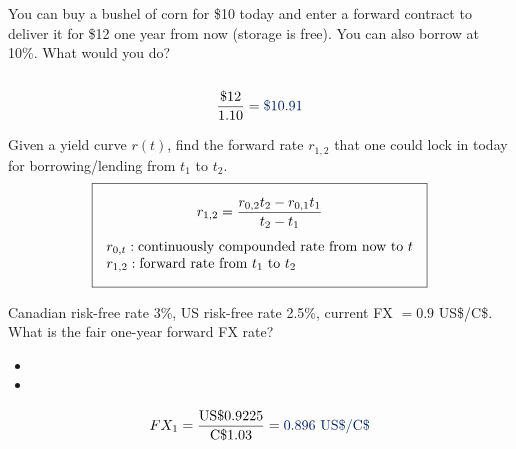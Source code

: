 \begin{example}
    You can buy a bushel of corn for \$10 today and enter a forward contract
    to deliver it for \$12 one year from now (storage is free). You can also
    borrow at 10\%. What would you do?
    \\
    \\
    \[\frac{\$12}{1.10} = \db{\$10.91}\]
\end{example}

\begin{example}
    Given a yield curve $r(t)$, find the forward rate $r_{1,2}$ that one
    could lock in today for borrowing/lending from $t_1$ to $t_2$.
    \\
    \[\boxed{\begin{gathered}
        r_{1,2} = \frac{r_{0,2}t_2 - r_{0,1}t_1}{t_2 - t_1}\\[4pt]
        \begin{array}{@{}l@{}}
            r_{0,t}: \text{continuously compounded rate from now to } t\\
            r_{1,2}: \text{forward rate from } t_1 \text{ to } t_2
        \end{array}
    \end{gathered}}\]
\end{example}

\begin{example}
    Canadian risk-free rate 3\%, US risk-free rate 2.5\%, current
    FX $= 0.9$ US\$/C\$. What is the fair one-year forward FX rate?
    \\
    \begin{itemize}
        \item {}
        \item {}
    \end{itemize}
    \[FX_1 = \frac{\text{US}\$0.9225}{\text{C}\$1.03} = \db{0.896 \text{ US\$/C\$}}\]
\end{example}


